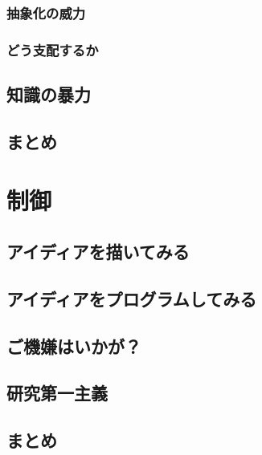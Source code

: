 \documentclass[dvipdfmx]{jsarticle}
\begin{document}
\subsubsection{抽象化の威力}

\subsubsection{どう支配するか}


\subsection{知識の暴力}


\subsection{まとめ}


\clearpage

\section{制御}

\subsection{アイディアを描いてみる}

\subsection{アイディアをプログラムしてみる}

\subsection{ご機嫌はいかが？}

\subsection{研究第一主義}

\subsection{まとめ}
\end{document}
